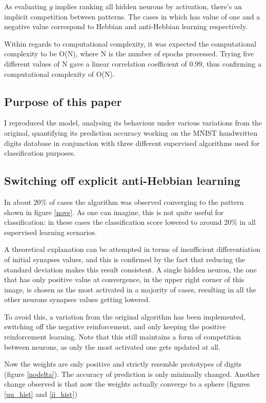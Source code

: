 \documentclass[a4paper]{report}
\begin{document}
As evaluating $g$ implies ranking all hidden neurons by activation, there's an implicit competition between patterns.
The cases in which has value of one and a negative value correspond to Hebbian and anti-Hebbian learning respectively.

Within regards to computational complexity, it was expected the computational complexity to be O(N), where N is the number of epochs processed.
Trying five different values of N gave a linear correlation coefficient of 0.99, thus confirming a computational complexity of O(N).

\subsection{Purpose of this paper}

I reproduced the model, analysing its behaviour under various variations from the original, quantifying its prediction accuracy working on the MNIST handwritten digits database in conjunction with three different supervised algorithms used for classification purposes.

\subsection{Switching off explicit anti-Hebbian learning}

In about 20\% of cases the algorithm was observed converging to the pattern shown in figure \ref{nove}.
As one can imagine, this is not quite useful for classification:
in these cases the classification score lowered to around 20\% in all supervised learning scenarios.

A theoretical explanation can be attempted in terms of insufficient differentiation of initial synapses values, and this is confirmed by the fact that reducing the standard deviation makes this result consistent.
A single hidden neuron, the one that has only positive value at convergence, in the upper right corner of this image, is chosen as the most activated in a majority of cases, resulting in all the other neurons synapses values getting lowered.

To avoid this, a variation from the original algorithm has been implemented, switching off the negative reinforcement, and only keeping the positive reinforcement learning.
Note that this still maintains a form of competition between neurons, as only the most activated one gets updated at all.

Now the weights are only positive and strictly resemble prototypes of digits (figure \ref{nodelta}).
The accuracy of prediction is only minimally changed.
Another change observed is that now the weights actually converge to a sphere (figures \ref{uu_hist} and \ref{ii_hist})
\end{document}
